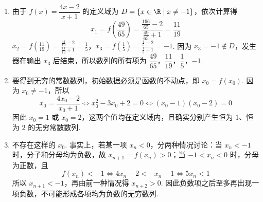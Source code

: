 \begin{solution}
\begin{enumerate}
\item 由于 \(f(x)=\dfrac{4x-2}{x+1}\) 的定义域为 \(D=\{x\in\R\mid x\ne-1\}\)，依次计算得
\[
x_1=f\left(\frac{49}{65}\right)=\frac{\frac{196}{65}-2}{\frac{49}{65}+1}=\frac{11}{19}
\]
\(x_2=f\left(\frac{11}{19}\right)=\frac{\frac{44}{19}-2}{\frac{11}{19}+1}=\frac{1}{5}\)，\(x_3=f\left(\frac{1}{5}\right)=\frac{\frac{4}{5}-2}{\frac{1}{5}+1}=-1\).
因为 \(x_3=-1\notin D\)，发生器在输出 \(x_3\) 后结束，所以数列的所有项为 \(\dfrac{49}{65}\)，\(\dfrac{11}{19}\)，\(\dfrac{1}{5}\)，\(-1\).
\item 要得到无穷的常数数列，初始数据必须是函数的不动点，即 \(x_0=f(x_0)\). 因为 \(x_0\ne-1\)，所以
\[
x_0=\frac{4x_0-2}{x_0+1}\Longleftrightarrow x_0^2-3x_0+2=0\Longleftrightarrow (x_0-1)(x_0-2)=0
\]
因此 \(x_0=1\) 或 \(x_0=2\)，这两个值均在定义域内，且确实分别产生恒为 \(1\)、恒为 \(2\) 的无穷常数数列.
\item 不存在这样的 \(x_0\). 事实上，若某一项 \(x_n<0\)，分两种情况讨论：当 \(x_n<-1\) 时，分子和分母均为负数，故 \(x_{n+1}=f(x_n)>0\)；当 \(-1<x_n<0\) 时，分母为正数，且
\[
f(x_n)<-1\Longleftrightarrow 4x_n-2<-x_n-1\Longleftrightarrow 5x_n<1
\]
所以 \(x_{n+1}<-1\)，再由前一种情况得 \(x_{n+2}>0\). 因此负数项之后至多再出现一项负数，不可能形成各项均为负数的无穷数列.
\end{enumerate}
\end{solution}
